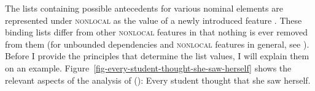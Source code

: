 \documentclass[output=paper,biblatex,babelshorthands,newtxmath,draftmode,colorlinks,citecolor=brown]{langscibook}
\begin{document}
\noindent
The lists containing possible antecedents for various nominal elements are represented under
\textsc{nonlocal} as the value of a newly introduced feature . These binding lists differ from
other \textsc{nonlocal} features in that nothing is ever removed from them (for unbounded dependencies
and \textsc{nonlocal} features in general, see ). Before I provide the principles that
determine the list values, I will explain them on an example.
Figure~\ref{fig-every-student-thought-she-saw-herself} shows the relevant aspects of the analysis of ():
\ea
Every student thought that she saw herself.
\z
\begin{sidewaysfigure}
\centering
\resizebox{.8\textwidth}{!}{%
\begin{forest}
[\avm{
   [ list-a  & < > \\
     list-z  & < > \\
     list-u  & < \1, \2, \3, \4, \5 >\\
     list-lu & < \1, \2, \3, \4, \5 > ] }
   [\avm{
     [ \ldots cont|conds & < \ldots, [ arg-r & \1 ], \ldots > \\
       \ldots |binding   & [ list-a  & < > \\
                             list-z  & < > \\
                             list-u  & < \1, \2, \3, \4, \5 >\\
                             list-lu & < \1 > ] ]}
     [ctx]]
   [\avm{
     [ list-a  & < \2, \3 > \\
       list-z  & < \2, \3 > \\
       list-u  & < \1, \2, \3, \4, \5 >\\
       list-lu & < \2, \3, \4, \5 > ]} 
     [\avm{
       [ \ldots anaphora & [ r-mark & \3 \\
                             var    & \2 \\ ]\\
         \ldots |binding   & [ list-a  & < \2, \3 > \\
                               list-z  & < \2, \3 > \\
                               list-u  & < \1, \2, \3, \4, \5 >\\
                               list-lu & < \2, \3 > ] ]} 
       [every student, roof]]
      [\avm{
          [ list-a  & < \2, \3 > \\
            list-z  & < \2, \3 > \\
            list-u  & < \1, \2, \3, \4, \5 >\\
}
\end{forest}}
\end{sidewaysfigure}
\end{document}
